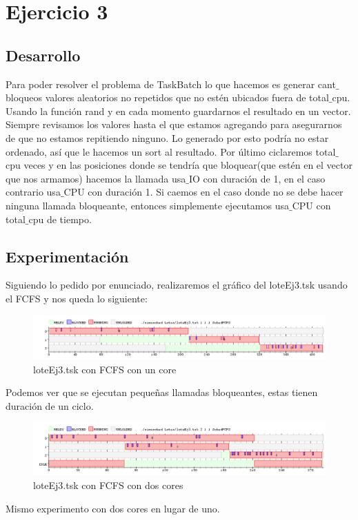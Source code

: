 
\section{Ejercicio 3}

\subsection{Desarrollo}
Para poder resolver el problema de TaskBatch lo que hacemos es generar cant$\_$bloqueos valores aleatorios no repetidos que no estén ubicados fuera de total$\_$cpu. Usando la
función rand y en cada momento guardarnos el resultado en un vector. Siempre revisamos los valores hasta el que estamos agregando para asegurarnos de que no estamos repitiendo
ninguno. Lo generado por esto podría no estar ordenado, así que le hacemos un sort al resultado. Por último ciclaremos total$\_$cpu veces y en las posiciones donde se tendría que 
bloquear(que estén en el vector que nos armamos) hacemos la llamada usa$\_$IO con duración de 1, en el caso contrario usa$\_$CPU con duración 1. Si caemos en el caso donde
no se debe hacer ninguna llamada bloqueante, entonces simplemente ejecutamos usa$\_$CPU con total$\_$cpu de tiempo.

\subsection{Experimentación}
Siguiendo lo pedido por enunciado, realizaremos el gráfico del loteEj3.tsk usando el FCFS y nos queda lo siguiente:

\begin{figure}[H]
  \centering
    \includegraphics[width=1.1\textwidth]{imagenes/BatchExperimento.png}
  \caption{loteEj3.tsk con FCFS con un core}
\end{figure}

Podemos ver que se ejecutan pequeñas llamadas bloqueantes, estas tienen duración de un ciclo. 

\begin{figure}[H]
  \centering
    \includegraphics[width=1.1\textwidth]{imagenes/BatchExperimento2cores.png}
  \caption{loteEj3.tsk con FCFS con dos cores}
\end{figure}

Mismo experimento con dos cores en lugar de uno.